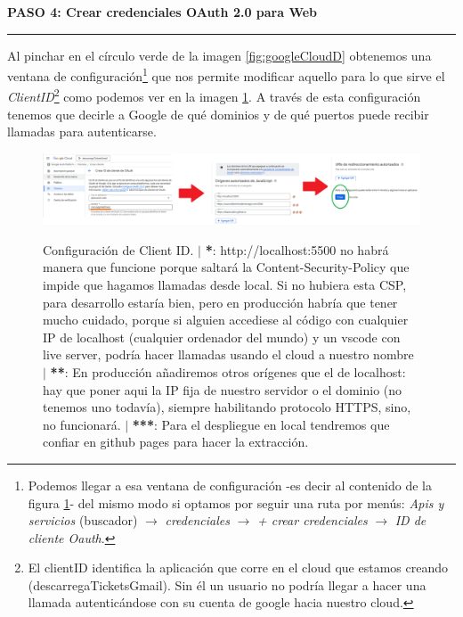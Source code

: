\documentclass[a4paper,12pt]{report}
\begin{document}
	\noindent \textbf{PASO 4: Crear credenciales OAuth 2.0 para Web}
	\vspace{.1em}
	\hrule
	\vspace{.5em}
	
	Al pinchar en el círculo verde de la imagen \ref{fig:googleCloudD} obtenemos una ventana de configuración\footnote{Podemos llegar a esa ventana de configuración -es decir al contenido de la figura \ref{fig:googleCloudE}- del mismo modo si optamos por seguir una ruta por menús: \textit{Apis y servicios} (buscador) $\rightarrow$ \textit{credenciales} $\rightarrow$ \textit{+ crear credenciales} $\rightarrow$ \textit{ID de cliente Oauth}.} que nos permite modificar aquello para lo que sirve el \textit{ClientID}\footnote{El clientID identifica la aplicación que corre en el cloud que estamos creando (descarregaTicketsGmail). Sin él un usuario no podría llegar a hacer una llamada autenticándose con su cuenta de google hacia nuestro cloud.} como podemos ver en la imagen \ref{fig:googleCloudE}. A través de esta configuración tenemos que decirle a Google de qué dominios y de qué puertos puede recibir llamadas para autenticarse.
	
	
	\FloatBarrier
	\setlength{\belowcaptionskip}{3pt}
	\begin{figure}[H]
		\centering
		\caption{Configuración de Client ID.  $|$ \textbf{*}: http://localhost:5500 no habrá manera que funcione porque saltará la Content-Security-Policy que impide que hagamos llamadas desde local. Si no hubiera esta CSP, para desarrollo estaría bien, pero en producción habría que tener mucho cuidado, porque si alguien accediese al código con cualquier IP de localhost (cualquier ordenador del mundo) y un vscode con live server, podría hacer llamadas usando el cloud a nuestro nombre  $|$ \textbf{**}: En producción añadiremos otros orígenes que el de localhost: hay que poner aqui la IP fija de nuestro servidor o el dominio (no tenemos uno todavía), siempre habilitando protocolo HTTPS, sino, no funcionará. $|$ \textbf{***}: Para el despliegue en local tendremos que confiar en github pages para hacer la extracción.}
		\includegraphics[width=1\linewidth]{img/googleCloudE.png} 
		\label{fig:googleCloudE}
	\end{figure}
	\FloatBarrier
	
\end{document}
